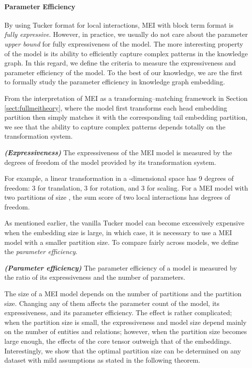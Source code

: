 \documentclass{ecai}
\theoremstyle{plain}  \newtheorem{thm}{Theorem}  \newtheorem{lem}[thm]{Lemma}  \newtheorem{prop}[thm]{Proposition}
\theoremstyle{remark}  \newtheorem*{rem}{Remark}
\begin{document}
\paragraph{Parameter Efficiency} By using Tucker format for local interactions, MEI with block term format is \textit{fully expressive}. However, in practice, we usually do not care about the parameter \textit{upper bound} for fully expressiveness of the model. The more interesting property of the model is its ability to efficiently capture complex patterns in the knowledge graph. In this regard, we define the criteria to measure the expressiveness and parameter efficiency of the model. To the best of our knowledge, we are the first to formally study the parameter efficiency in knowledge graph embedding.

From the interpretation of MEI as a transforming--matching framework in Section \ref{sect:fullmeitheory}, where the model first transforms each head embedding partition then simply matches it with the corresponding tail embedding partition, we see that the ability to capture complex patterns depends totally on the transformation system.
\begin{defn} \textbf{\textit{(Expressiveness)}} \label{def:expressive}
	The expressiveness of the MEI model is measured by the degrees of freedom of the model provided by its transformation system. 
\end{defn}
For example, a linear transformation in a -dimensional space has 9 degrees of freedom: 3 for translation, 3 for rotation, and 3 for scaling. For a MEI model with two partitions of size , the sum score of two local interactions has  degrees of freedom.

As mentioned earlier, the vanilla Tucker model can become excessively expensive when the embedding size is large, in which case, it is necessary to use a MEI model with a smaller partition size. To compare fairly across models, we define the \textit{parameter efficiency}.
\begin{defn} \textbf{\textit{(Parameter efficiency)}} \label{def:paramefficient}
	The parameter efficiency of a model is measured by the ratio of its expressiveness and the number of parameters. 
\end{defn}

The size of a MEI model depends on the number of partitions and the partition size. Changing any of them affects the parameter count of the model, its expressiveness, and its parameter efficiency. The effect is rather complicated; when the partition size is small, the expressiveness and model size depend mainly on the number of entities and relations; however, when the partition size becomes large enough, the effects of the core tensor outweigh that of the embeddings. Interestingly, we show that the optimal partition size can be determined on any dataset with mild assumptions as stated in the following theorem.
\end{document}
